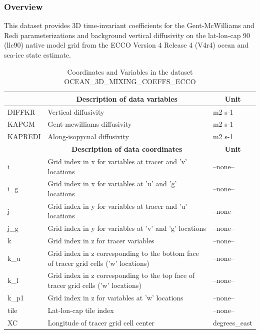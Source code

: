 \subsubsection{Overview}
This dataset provides 3D time-invariant coefficients for the Gent-McWilliams and Redi parameterizations and background vertical diffusivity on the lat-lon-cap 90 (llc90) native model grid from the ECCO Version 4 Release 4 (V4r4) ocean and sea-ice state estimate. 
\begin{longtable}{|m{}|m{}|m{}|}
\caption{Coordinates and Variables in the dataset OCEAN\_3D\_MIXING\_COEFFS\_ECCO}
\label{tab:table-OCEAN_3D_MIXING_COEFFS_ECCO-fields} \\ 
\hline \endhead \hline \endfoot
\rowcolor{lightgray} \multicolumn{1}{|c|}{\textbf{Variables}} & \multicolumn{1}{|c|}{\textbf{Description of data variables}} &  \multicolumn{1}{|c|}{\textbf{Unit}}\\ \hline
DIFFKR &Vertical diffusivity &m2 s-1  \\ \hline
KAPGM &Gent-mcwilliams diffusivity &m2 s-1  \\ \hline
KAPREDI &Along-isopycnal diffusivity &m2 s-1  \\ \hline
\rowcolor{lightgray} \multicolumn{1}{|c|}{\textbf{Coordinates}} & \multicolumn{1}{|c|}{\textbf{Description of data coordinates}} &  \multicolumn{1}{|c|}{\textbf{Unit}}\\ \hline
i &Grid index in x for variables at tracer and 'v' locations &--none--  \\ \hline
i\_g &Grid index in x for variables at 'u' and 'g' locations &--none--  \\ \hline
j &Grid index in y for variables at tracer and 'u' locations &--none--  \\ \hline
j\_g &Grid index in y for variables at 'v' and 'g' locations &--none--  \\ \hline
k &Grid index in z for tracer variables &--none--  \\ \hline
k\_u &Grid index in z corresponding to the bottom face of tracer grid cells ('w' locations) &--none--  \\ \hline
k\_l &Grid index in z corresponding to the top face of tracer grid cells ('w' locations) &--none--  \\ \hline
k\_p1 &Grid index in z for variables at 'w' locations &--none--  \\ \hline
tile &Lat-lon-cap tile index &--none--  \\ \hline
XC &Longitude of tracer grid cell center &degrees\_east  \\ \hline

\end{longtable}

